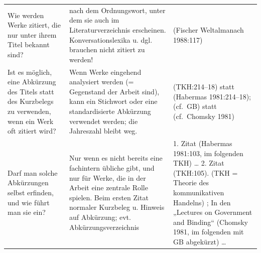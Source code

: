 \documentclass[]{book}
\theoremstyle{definition}
\theoremstyle{definition}
\theoremstyle{definition}
\theoremstyle{remark}
\begin{document}
\begin{longtable}[]{@{}lll@{}}
\begin{minipage}[t]{0.18\columnwidth}\raggedright\strut
Wie werden Werke zitiert, die nur unter ihrem Titel bekannt sind?\strut
\end{minipage} & \begin{minipage}[t]{0.37\columnwidth}\raggedright\strut
nach dem Ordnungswort, unter dem sie auch im Literaturverzeichnis
erscheinen. Konversationslexika u. dgl. brauchen nicht zitiert zu
werden!\strut
\end{minipage} & \begin{minipage}[t]{0.36\columnwidth}\raggedright\strut
(Fischer Weltalmanach 1988:117) \vspace{-6mm}\strut
\end{minipage}\tabularnewline
\begin{minipage}[t]{0.18\columnwidth}\raggedright\strut
Ist es möglich, eine Abkürzung des Titels statt des Kurzbelegs zu
verwenden, wenn ein Werk oft zitiert wird?\strut
\end{minipage} & \begin{minipage}[t]{0.37\columnwidth}\raggedright\strut
Wenn Werke eingehend analysiert werden (= Gegenstand der Arbeit sind),
kann ein Stichwort oder eine standardisierte Abkürzung verwendet werden;
die Jahreszahl bleibt weg.\strut
\end{minipage} & \begin{minipage}[t]{0.36\columnwidth}\raggedright\strut
(TKH:214--18) statt (Habermas 1981:214--18); (cf.~GB) statt (cf.~Chomsky
1981) \vspace{-6mm}\strut
\end{minipage}\tabularnewline
\begin{minipage}[t]{0.18\columnwidth}\raggedright\strut
Darf man solche Abkürzungen selbst erfinden, und wie führt man sie
ein?\strut
\end{minipage} & \begin{minipage}[t]{0.37\columnwidth}\raggedright\strut
Nur wenn es nicht bereits eine fachintern übliche gibt, und nur für
Werke, die in der Arbeit eine zentrale Rolle spielen. Beim ersten Zitat
normaler Kurzbeleg u. Hinweis auf Abkürzung; evt.
Abkürzungsverzeichnis\strut
\end{minipage} & \begin{minipage}[t]{0.36\columnwidth}\raggedright\strut
1. Zitat (Habermas 1981:103, im folgenden TKH) \ldots{} 2. Zitat
(TKH:105). (TKH = Theorie des kommunikativen Handelns) ; In den
„Lectures on Government and Binding`` (Chomsky 1981, im folgenden mit GB
abgekürzt) \ldots{}\strut
\end{minipage}\tabularnewline
\bottomrule
\end{longtable}
\end{document}
